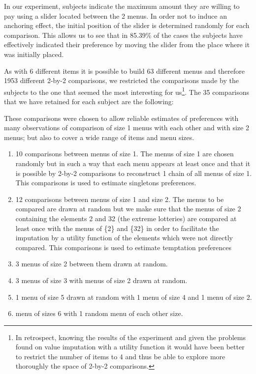 \documentclass[
]{book}
\providecommand{\tightlist}{%
  \setlength{\itemsep}{0pt}\setlength{\parskip}{0pt}}
\begin{document}
In our experiment, subjects indicate the maximum amount they are willing to pay
using a slider located between the 2 menus.
In order not to induce an anchoring effect, the initial position of the slider
is determined randomly for each comparison.
This allows us to see that in 85.39\% of the
cases the subjects have effectively indicated their preference by moving the
slider from the place where it was initially placed.

As with 6 different items it is possible to build 63 different menus and
therefore 1953 different 2-by-2 comparisons, we restricted the comparisons made
by the subjects to the one that seemed the most interesting for us\footnote{In retrospect, knowing the results of the experiment and given the problems found on value
  imputation with a utility function it would have been better to restrict the
  number of items to 4 and thus be able to explore more thoroughly the space of 2-by-2 comparisons.}.
The 35 comparisons that we have retained for each subject are the following:

These comparisons were chosen to allow reliable estimates of preferences with many
observations of comparison of size 1 menus with each other and with size 2
menus;
but also to cover a wide range of items and menu sizes.

\begin{enumerate}
\def\labelenumi{\arabic{enumi}.}
\tightlist
\item
  10 comparisons between menus of size 1.
  The menus of size 1 are chosen randomly but in such a way that each menu appears
  at least once and that it is possible by 2-by-2 comparisons to reconstruct 1
  chain of all menus of size 1.
  This comparisons is used to estimate singletons preferences.
\item
  12 comparisons between menus of size 1 and size 2.
  The menus to be compared are drawn at random but we make sure that the menus of
  size 2 containing the elements 2 and 32 (the extreme lotteries) are compared at
  least once with the menus of \{2\} and \{32\} in order to facilitate the imputation
  by a utility function of the elements which were not directly compared.
  This comparisons is used to estimate temptation preferences
\item
  3 menus of size 2 between them drawn at random.
\item
  3 menus of size 3 with menus of size 2 drawn at random.
\item
  1 menu of size 5 drawn at random with 1 menu of size 4 and 1 menu of size 2.
\item
  menu of sizes 6 with 1 random menu of each other size.
\end{enumerate}
\end{document}
